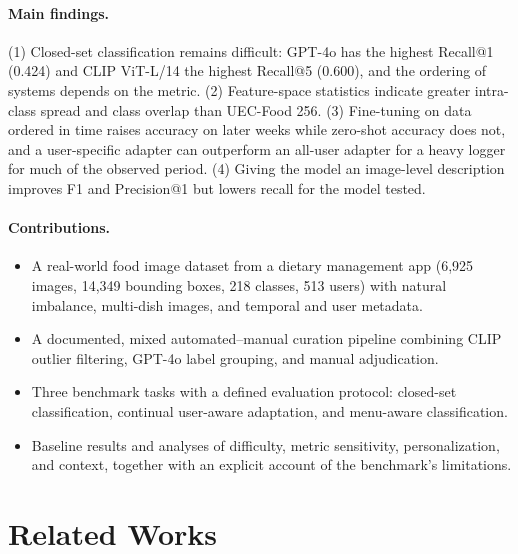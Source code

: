 \documentclass[sigconf, nonacm]{acmart}
\begin{document}
\paragraph{Main findings.} (1) Closed-set classification remains difficult: GPT-4o has the highest Recall@1 (0.424) and CLIP ViT-L/14 the highest Recall@5 (0.600), and the ordering of systems depends on the metric. (2) Feature-space statistics indicate greater intra-class spread and class overlap than UEC-Food 256. (3) Fine-tuning on data ordered in time raises accuracy on later weeks while zero-shot accuracy does not, and a user-specific adapter can outperform an all-user adapter for a heavy logger for much of the observed period. (4) Giving the model an image-level description improves F1 and Precision@1 but lowers recall for the model tested.

\paragraph{Contributions.}
\begin{itemize}[leftmargin=1.2em,itemsep=0pt,topsep=2pt]
  \item A real-world food image dataset from a dietary management app (6,925 images, 14,349 bounding boxes, 218 classes, 513 users) with natural imbalance, multi-dish images, and temporal and user metadata.
  \item A documented, mixed automated--manual curation pipeline combining CLIP outlier filtering, GPT-4o label grouping, and manual adjudication.
  \item Three benchmark tasks with a defined evaluation protocol: closed-set classification, continual user-aware adaptation, and menu-aware classification.
  \item Baseline results and analyses of difficulty, metric sensitivity, personalization, and context, together with an explicit account of the benchmark's limitations.
\end{itemize}

\section{Related Works}
\end{document}
